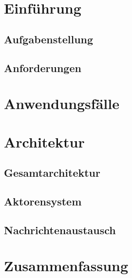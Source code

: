 \section{Einführung}\label{sec:intro} %


    \subsection{Aufgabenstellung}\label{sec:task_definition} %
    

    \subsection{Anforderungen}\label{sec:requirements} %
    

\newpage
\section{Anwendungsfälle}\label{sec:use_cases} %


\newpage
\section{Architektur}\label{sec:architecture} %


    \subsection{Gesamtarchitektur}\label{sec:overall_architecture} %
    

    \subsection{Aktorensystem}\label{sec:actor_system} %
    

    \subsection{Nachrichtenaustausch}\label{sec:message_exchange} %
    

\newpage
\section{Zusammenfassung}\label{sec:conclusion} %

